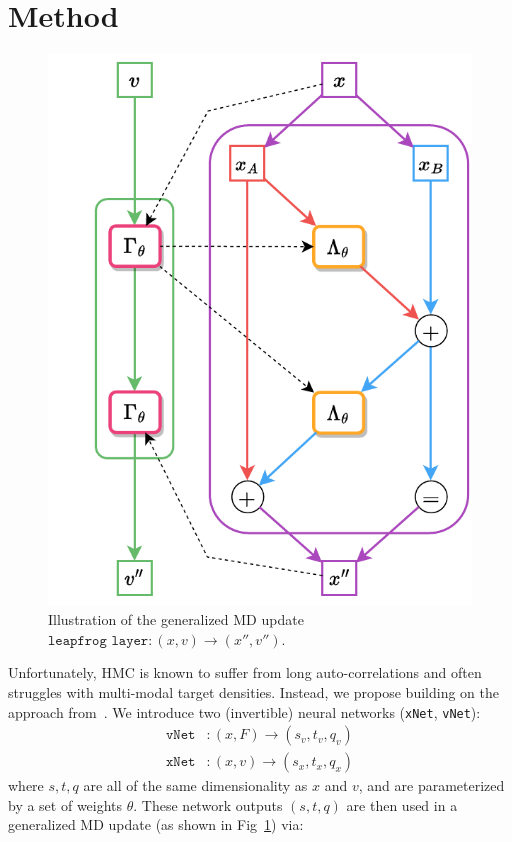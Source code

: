 \documentclass[a4paper,11pt]{article}
\begin{document}
\section{\label{sec:method}Method}
%
\begin{figure}
  \begin{center}
    \includegraphics[width=\linewidth]{assets/leapfrog-layer-alt-2.pdf}
  \end{center}
    \caption{\label{fig:lf-layer}Illustration of the generalized MD update $\texttt{leapfrog layer}: (x, v) \rightarrow (x'', v'')$.}
\end{figure}
%
Unfortunately, HMC is known to suffer from long auto-correlations and often struggles with multi-modal target densities.
%
Instead, we propose building on the approach from~\cite{L2HMC,FTHMC,etc}. We introduce two (invertible) neural networks (\texttt{xNet}, \texttt{vNet}):
%
\begin{align}
\texttt{vNet}&: (x, F) \rightarrow (s_{v}, t_{v}, q_{v}) \\
\texttt{xNet}&: (x, v) \rightarrow (s_{x}, t_{x}, q_{x})
\end{align}
%
where $s, t, q$ are all of the same dimensionality as $x$ and $v$, and are parameterized by a set of weights $\theta$.
%
These network outputs $(s, t, q)$ are then used in a generalized MD update (as shown in Fig~\ref{fig:lf-layer}) via:
%
\end{document}
